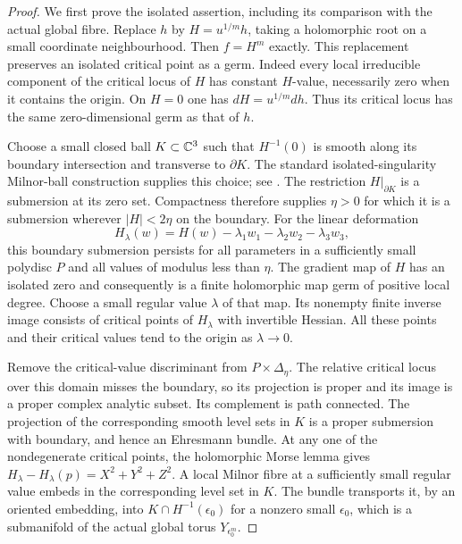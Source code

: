 \begin{proof}
We first prove the isolated assertion, including its
comparison with the actual global fibre. Replace $h$
by $H=u^{1/m}h$, taking a holomorphic root on a small
coordinate neighbourhood. Then $f=H^m$ exactly.
This replacement preserves an isolated critical point
as a germ. Indeed every local irreducible component
of the critical locus of $H$ has constant $H$-value,
necessarily zero when it contains the origin. On
$H=0$ one has $dH=u^{1/m}dh$. Thus its critical
locus has the same zero-dimensional germ as that
of $h$.

Choose a small closed ball $K\subset\mathbb C^3$ such that
$H^{-1}(0)$ is smooth along its boundary intersection
and transverse to $\partial K$.
The standard isolated-singularity Milnor-ball
construction supplies this choice; see
\cite[Lemma 6.1 and Appendix B]{Milnor1968}.
The restriction $H|_{\partial K}$ is a submersion
at its zero set. Compactness therefore supplies
$\eta>0$ for which it is a submersion wherever
$|H|<2\eta$ on the boundary. For the linear
deformation
\[
 H_\lambda(w)=H(w)-\lambda_1w_1
                         -\lambda_2w_2-\lambda_3w_3,
                                                        \tag{A.J.38a}
\]
this boundary submersion persists for all parameters
in a sufficiently small polydisc $P$ and all values
of modulus less than $\eta$. The gradient map of
$H$ has an isolated zero and consequently is a finite
holomorphic map germ of positive local degree. Choose
a small regular value $\lambda$ of that map. Its
nonempty finite inverse image consists of critical
points of $H_\lambda$ with invertible Hessian. All
these points and their critical values tend to the
origin as $\lambda\to0$.

Remove the critical-value discriminant from
$P\times\Delta_\eta$. The relative critical locus
over this domain misses the boundary, so its
projection is proper and its image is a proper
complex analytic subset. Its complement is path
connected. The projection of the corresponding
smooth level sets in $K$ is a proper submersion
with boundary, and hence an Ehresmann bundle.
At any one of the nondegenerate critical points,
the holomorphic Morse lemma gives
$H_\lambda-H_\lambda(p)=X^2+Y^2+Z^2$.
A local Milnor fibre at a sufficiently small regular
value embeds in the corresponding level set in $K$.
The bundle transports it, by an oriented embedding,
into $K\cap H^{-1}(\epsilon_0)$ for a nonzero small
$\epsilon_0$, which is a submanifold of the actual
global torus $Y_{\epsilon_0^m}$.


\end{proof}
